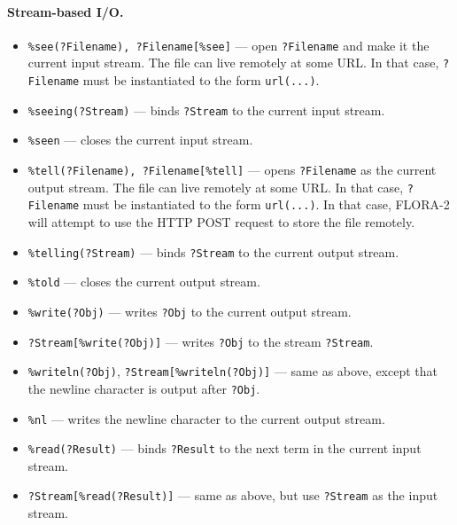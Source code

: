 \documentclass[11pt]{article}
\begin{document}
\paragraph{Stream-based I/O.}
\begin{itemize}
\item  {\tt \%see(?Filename), ?Filename[\%see]} --- open {\tt ?Filename} and make it the
  current input stream.
  The file can live remotely at some URL. In that case, {\tt ?Filename}
  must be instantiated to the form {\tt url(...)}.  
\item {\tt \verb|%|seeing(?Stream)} --- binds {\tt ?Stream} to the current input
  stream.
\item {\tt \verb|%|seen} --- closes the current input stream.
\item {\tt \%tell(?Filename), ?Filename[\%tell]} --- opens {\tt ?Filename} as the current output
  stream. The file can live remotely at some URL. In that case, {\tt ?Filename}
  must be instantiated to the form {\tt url(...)}.
  In that case, FLORA-2 will attempt to use the HTTP POST request to store
  the file remotely.
\item {\tt \verb|%|telling(?Stream)} --- binds {\tt ?Stream} to the current output
  stream. 
\item {\tt \verb|%|told} --- closes the current output stream.
\item {\tt \verb|%|write(?Obj)} --- writes {\tt ?Obj} to the current output stream.
\item {\tt ?Stream[\%write(?Obj)]} --- writes {\tt ?Obj} to the stream {\tt ?Stream}.
\item {\tt \verb|%|writeln(?Obj)}, {\tt ?Stream[\%writeln(?Obj)]} --- same as above,
  except that the newline character is output after {\tt ?Obj}.
\item {\tt \verb|%|nl} --- writes the newline character to the current output
  stream.
\item {\tt \verb|%|read(?Result)} --- binds {\tt ?Result} to the next term in the
  current input stream.
\item {\tt ?Stream[\%read(?Result)]} --- same as above, but use {\tt ?Stream}
  as the input stream.
\end{itemize}
\end{document}
